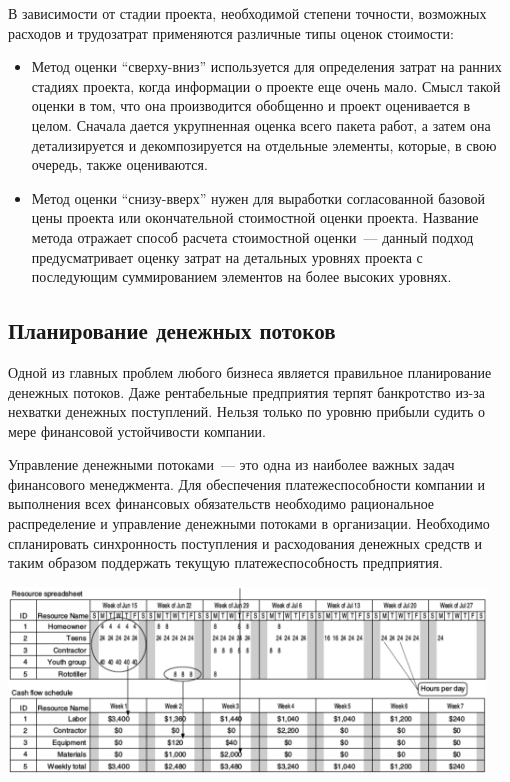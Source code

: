 \documentclass{../../text-style}
\begin{document}
В зависимости от стадии проекта, необходимой степени точности, возможных расходов и трудозатрат применяются различные типы оценок стоимости:
\begin{itemize}
    \item Метод оценки \enquote{сверху-вниз} используется для определения затрат на ранних стадиях проекта, когда информации о проекте еще очень мало. Смысл такой оценки в том, что она производится обобщенно и проект оценивается в целом. Сначала дается укрупненная оценка всего пакета работ, а затем она детализируется и декомпозируется на отдельные элементы, которые, в свою очередь, также оцениваются.
    \item Метод оценки \enquote{снизу-вверх} нужен для выработки согласованной базовой цены проекта или окончательной стоимостной оценки проекта. Название метода отражает способ расчета стоимостной оценки~--- данный подход предусматривает оценку затрат на детальных уровнях проекта с последующим суммированием элементов на более высоких уровнях.
\end{itemize}

\subsection{Планирование денежных потоков}

Одной из главных проблем любого бизнеса является правильное планирование денежных потоков. Даже рентабельные предприятия терпят банкротство из-за нехватки денежных поступлений. Нельзя только по уровню прибыли судить о мере финансовой устойчивости компании.

Управление денежными потоками~--- это одна из наиболее важных задач финансового менеджмента. Для обеспечения платежеспособности компании и выполнения всех финансовых обязательств необходимо рациональное распределение и управление денежными потоками в организации. Необходимо спланировать синхронность поступления и расходования денежных средств и таким образом поддержать текущую платежеспособность предприятия.

\begin{center}
    \includegraphics[width=0.95\textwidth]{cashFlow.png}
\end{center}
\end{document}
